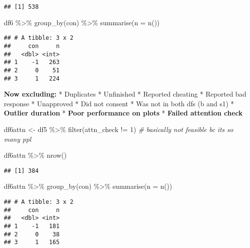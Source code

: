 \documentclass[
]{article}
\newenvironment{Shaded}{\begin{snugshade}}{\end{snugshade}}
\newcommand{\AttributeTok}[1]{\textcolor[rgb]{0.77,0.63,0.00}{#1}}
\newcommand{\CommentTok}[1]{\textcolor[rgb]{0.56,0.35,0.01}{\textit{#1}}}
\newcommand{\DecValTok}[1]{\textcolor[rgb]{0.00,0.00,0.81}{#1}}
\newcommand{\FunctionTok}[1]{\textcolor[rgb]{0.00,0.00,0.00}{#1}}
\newcommand{\NormalTok}[1]{#1}
\newcommand{\OtherTok}[1]{\textcolor[rgb]{0.56,0.35,0.01}{#1}}
\newcommand{\SpecialCharTok}[1]{\textcolor[rgb]{0.00,0.00,0.00}{#1}}
\begin{document}
\begin{verbatim}
## [1] 538
\end{verbatim}

\begin{Shaded}
\begin{Highlighting}[]
\NormalTok{df6 }\SpecialCharTok{\%\textgreater{}\%} 
  \FunctionTok{group\_by}\NormalTok{(con) }\SpecialCharTok{\%\textgreater{}\%} 
  \FunctionTok{summarise}\NormalTok{(}\AttributeTok{n =} \FunctionTok{n}\NormalTok{())}
\end{Highlighting}
\end{Shaded}

\begin{verbatim}
## # A tibble: 3 x 2
##     con     n
##   <dbl> <int>
## 1    -1   263
## 2     0    51
## 3     1   224
\end{verbatim}

\textbf{Now excluding:} * Duplicates * Unfinished * Reported cheating *
Reported bad response * Unapproved * Did not consent * Was not in both
dfs (b and s1) * \textbf{Outlier duration} * \textbf{Poor performance on
plots} * \textbf{Failed attention check}

\begin{Shaded}
\begin{Highlighting}[]
\NormalTok{df6attn }\OtherTok{\textless{}{-}}\NormalTok{ df5 }\SpecialCharTok{\%\textgreater{}\%} 
  \FunctionTok{filter}\NormalTok{(attn\_check }\SpecialCharTok{!=} \DecValTok{1}\NormalTok{) }\CommentTok{\# basically not feasible bc it\textquotesingle{}s so many ppl}

\NormalTok{df6attn }\SpecialCharTok{\%\textgreater{}\%} 
  \FunctionTok{nrow}\NormalTok{()}
\end{Highlighting}
\end{Shaded}

\begin{verbatim}
## [1] 384
\end{verbatim}

\begin{Shaded}
\begin{Highlighting}[]
\NormalTok{df6attn }\SpecialCharTok{\%\textgreater{}\%} 
  \FunctionTok{group\_by}\NormalTok{(con) }\SpecialCharTok{\%\textgreater{}\%} 
  \FunctionTok{summarise}\NormalTok{(}\AttributeTok{n =} \FunctionTok{n}\NormalTok{())}
\end{Highlighting}
\end{Shaded}

\begin{verbatim}
## # A tibble: 3 x 2
##     con     n
##   <dbl> <int>
## 1    -1   181
## 2     0    38
## 3     1   165
\end{verbatim}
\end{document}
